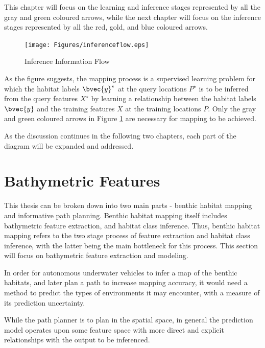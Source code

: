 		This chapter will focus on the learning and inference stages represented by all the {\color{Gray} gray} and {\color{ForestGreen} green} coloured arrows, while the next chapter will focus on the inference stages represented by all the {\color{OrangeRed} red}, {\color{YellowOrange} gold}, and {\color{Cerulean} blue} coloured arrows.
		
		\begin{figure}[!htbp]
		\centering
			\texttt{[image: Figures/inferenceflow.eps]}
		\caption{Inference Information Flow}
		\label{Figure:InferenceFlow}
		\end{figure}	

		As the figure suggests, the mapping process is a supervised learning problem for which the habitat labels $\bvec{y}^{\star}$ at the query locations $P^{\star}$ is to be inferred from the query features $X^{\star}$ by learning a relationship between the habitat labels $\bvec{y}$ and the training features $X$ at the training locations $P$. Only the {\color{Gray} gray} and {\color{ForestGreen} green} coloured arrows in Figure \ref{Figure:InferenceFlow} are necessary for mapping to be achieved.
		
		As the discussion continues in the following two chapters, each part of the diagram will be expanded and addressed.
		
	\section{Bathymetric Features}
	\label{BenthicHabitatMapping:BathymetricFeatures}
	
		This thesis can be broken down into two main parts - benthic habitat mapping and informative path planning. Benthic habitat mapping itself includes bathymetric feature extraction, and habitat class inference. Thus, benthic habitat mapping refers to the two stage process of feature extraction and habitat class inference, with the latter being the main bottleneck for this process. This section will focus on bathymetric feature extraction and modeling.
			
		In order for autonomous underwater vehicles to infer a map of the benthic habitats, and later plan a path to increase mapping accuracy, it would need a method to predict the types of environments it may encounter, with a measure of its prediction uncertainty.
		
		While the path planner is to plan in the spatial space, in general the prediction model operates upon some feature space with more direct and explicit relationships with the output to be inferenced.
		
